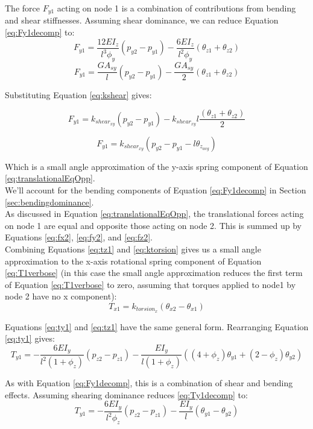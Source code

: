 {The force $F_{y1}$ acting on node 1 is a combination of contributions from bending and shear stiffnesses.  Assuming shear dominance, we can reduce Equation \ref{eq:Fy1decomp} to:
\[ F_{y1} =  \dfrac{12EI_z}{l^3\phi_y} (p_{y2} -p_{y1}) - \dfrac{6EI_z}{l^2\phi_y}(\theta_{z1} + \theta_{z2}) 
\]
\[ F_{y1} =  \dfrac{GA_{sy}}{l} (p_{y2} -p_{y1}) - \dfrac{GA_{sy}}{2}(\theta_{z1} + \theta_{z2}) 
\]

Substituting Equation \ref{eq:kshear} gives:

\[ F_{y1} =  k_{shear_{xy}} (p_{y2} -p_{y1}) - k_{shear_{xy}}l\dfrac{(\theta_{z1} + \theta_{z2})}{2}
\]

\[ F_{y1} =  k_{shear_{xy}} (p_{y2} -p_{y1} - l\theta_{z_{avg}})
\]

Which is a	 small angle approximation of the y-axis spring component of Equation \ref{eq:translationalEqOpp}.\\

We'll account for the bending components of Equation \ref{eq:Fy1decomp} in Section \ref{sec:bendingdominance}.\\

As discussed in Equation \ref{eq:translationalEqOpp}, the translational forces acting on node 1 are equal and opposite those acting on node 2.  This is summed up by Equations \ref{eq:fx2}, \ref{eq:fy2}, and \ref{eq:fz2}.\\

Combining Equations \ref{eq:tz1} and \ref{eq:ktorsion} gives us a small angle approximation to the x-axis rotational spring component of Equation \ref{eq:T1verbose} (in this case the small angle approximation reduces the first term of Equation \ref{eq:T1verbose} to zero, assuming that torques applied to node1 by node 2 have no x component):
\[T_{x1} =  k_{torsion_x}(\theta_{x2} - \theta_{x1}) \]

Equations \ref{eq:ty1} and \ref{eq:tz1} have the same general form.  Rearranging Equation \ref{eq:ty1} gives:
\begin{equation}\label{eq:Ty1decomp}
T_{y1} = - \dfrac{6EI_y}{l^2(1+\phi_z)}(p_{z2}- p_{z1}) - \dfrac{EI_y}{l(1+\phi_z)}((4+\phi_z)\theta_{y1}  + (2-\phi_z)\theta_{y2})
\end{equation}

As with Equation \ref{eq:Fy1decomp}, this is a combination of shear and bending effects.  Assuming shearing dominance reduces \ref{eq:Ty1decomp} to:
\begin{equation}\label{eq:Ty1decomp2}
T_{y1} = - \dfrac{6EI_y}{l^2\phi_z}(p_{z2}- p_{z1}) - \dfrac{EI_y}{l}(\theta_{y1}  - \theta_{y2})
\end{equation}

}
